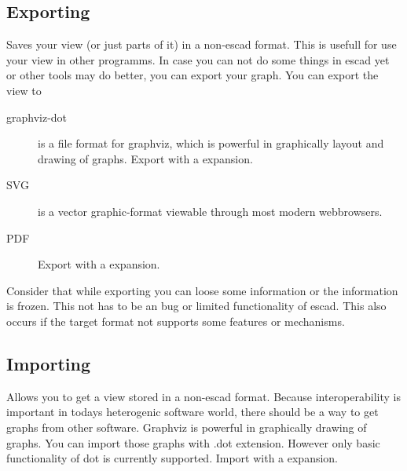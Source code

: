 \documentclass[a4paper, 12pt, openany]{scrbook}
\begin{document}
\subsection{Exporting}
Saves your view (or just parts of it) in a non-escad format. This is usefull for use your view in other programms.
In case you can not do some things in escad yet or other tools may do better, you can export your graph. You can export the view to
\begin{description}
\item[graphviz-dot] is a file format for graphviz, which is powerful in graphically layout and drawing of graphs. Export with a expansion.
\item[SVG] is a vector graphic-format viewable through most modern webbrowsers.
\item[PDF] Export with a expansion.
\end{description}
Consider that while exporting you can loose some information or the information is frozen. This not has to be an bug or limited functionality of escad. This also occurs if the target format not supports some features or mechanisms.
\subsection{Importing}
Allows you to get a view stored in a non-escad format.
Because interoperability is important in todays heterogenic software world, there should be a way to get graphs from other software.
Graphviz is powerful in graphically drawing of graphs. You can import those graphs with .dot extension. However only basic functionality of dot is currently supported. Import with a expansion.
\end{document}
